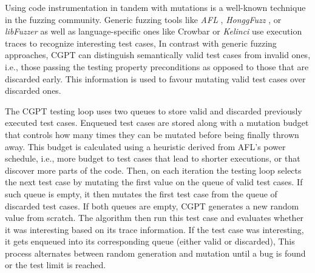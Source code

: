 \documentclass[sigconf,review,anonymous]{acmart}
\begin{document}
Using code instrumentation in tandem with mutations is a well-known technique in
the fuzzing community.
%
Generic fuzzing tools like \emph{AFL} \cite{afl}, \emph{HonggFuzz}
\cite{honggfuzz}, or \emph{libFuzzer} \citeyearpar{libfuzzer} as well as
language-specific ones like Crowbar \cite{dolan2017testing} or \emph{Kelinci}
\cite{kersten2017poster} use execution traces to recognize interesting test
cases, 
%
%
%
%
In contrast with generic fuzzing approaches, CGPT can distinguish semantically
valid test cases from invalid ones, i.e., those passing the testing property
preconditions as opposed to those that are discarded early.
%
This information is used to favour mutating valid test cases over discarded
ones.


The CGPT testing loop uses two queues to store valid and discarded previously
executed test cases.
%
Enqueued test cases are stored along with a mutation budget that controls how
many times they can be mutated before being finally thrown away.
%
This budget is calculated using a heuristic derived from AFL's power schedule,
i.e., more budget to test cases that lead to shorter executions, or that
discover more parts of the code.
%
Then, on each iteration the testing loop selects the next test case by mutating
the first value on the queue of valid test cases.
%
If such queue is empty, it then mutates the first test case from the queue of
discarded test cases.
%
If both queues are empty, CGPT generates a new random value from scratch.
%
The algorithm then run this test case and evaluates whether it was interesting
based on its trace information.
%
If the test case was interesting, it gets enqueued into its corresponding queue
(either valid or discarded),
%
%
This process alternates between random generation and mutation until a bug is
found or the test limit is reached.
\end{document}

